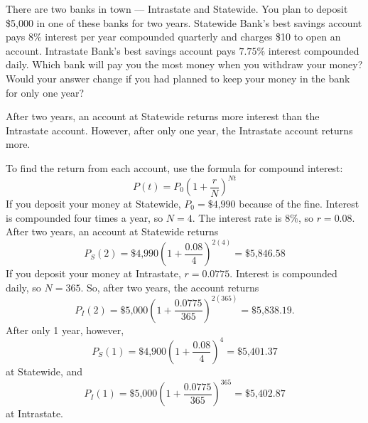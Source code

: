 \documentclass{ximera}
\begin{document}
\begin{computerExercise} \label{c3.1.9}
There are two banks in town --- Intrastate and Statewide.  You plan
to deposit \$5,000 in one of these banks for two years.  Statewide Bank's
best savings account pays $8\%$ interest per year compounded quarterly
and charges \$10 to open an account.  Intrastate Bank's best savings
account pays $7.75\%$ interest compounded daily.  Which bank will
pay you the most money when you withdraw your money?  Would your
answer change if you had planned to keep your money in the bank
for only one year?

\begin{solution}

\ans After two years, an account at Statewide returns more interest than
the Intrastate account.  However, after only one year, the Intrastate
account returns more.

\soln To find the return from each account, use the formula for
compound interest:
\[
P(t) = P_0\left(1 + \frac{r}{N}\right)^{Nt}
\]
If you deposit your money at Statewide, $P_0 = \$4\mbox{,}990$ because of the
fine.  Interest is compounded four times a year, so $N = 4$.  The interest
rate is 8\%, so $r = 0.08$.
After two years, an account at Statewide returns
\[
P_{S}(2) = \$4\mbox{,}990\left(1 + \frac{0.08}{4}\right)^{2(4)} = 
\$5\mbox{,}846.58
\]
If you deposit your money at Intrastate, $r = 0.0775$.  Interest is
compounded daily, so $N = 365$.  So, after two years, the account returns
\[
P_{I}(2) = \$5\mbox{,}000\left(1 + \frac{0.0775}{365}\right)^{2(365)} = 
\$5\mbox{,}838.19.
\]
After only 1 year, however,
\[
P_{S}(1) = \$4\mbox{,}900\left(1 + \frac{0.08}{4}\right)^{4} = \$5\mbox{,}401.37
\]
at Statewide, and
\[
P_{I}(1) = \$5\mbox{,}000\left(1 + \frac{0.0775}{365}\right)^{365} = 
\$5\mbox{,}402.87
\]
at Intrastate.

\end{solution}
\end{computerExercise}
\end{document}
